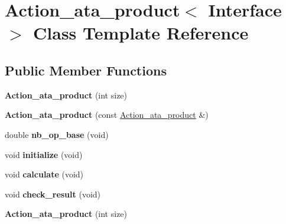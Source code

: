 \hypertarget{class_action__ata__product}{}\section{Action\+\_\+ata\+\_\+product$<$ Interface $>$ Class Template Reference}
\label{class_action__ata__product}
\subsection*{Public Member Functions}
\begin{DoxyCompactItemize}
\item 
\mbox{\label{class_action__ata__product_a54b37758c8600b09fe6f28ec260f2f4a}} 
{\bfseries Action\+\_\+ata\+\_\+product} (int size)
\item 
\mbox{\label{class_action__ata__product_a6ae7e6e084d74197f228c9efeb6833a3}} 
{\bfseries Action\+\_\+ata\+\_\+product} (const \hyperlink{class_action__ata__product}{Action\+\_\+ata\+\_\+product} \&)
\item 
\mbox{\label{class_action__ata__product_a63f70df6346f567e1015180b0282ff5c}} 
double {\bfseries nb\+\_\+op\+\_\+base} (void)
\item 
\mbox{\label{class_action__ata__product_aaac67c03f0421329ff311ebd1cca9dd9}} 
void {\bfseries initialize} (void)
\item 
\mbox{\label{class_action__ata__product_a15573d7fc39e087347d3cdf998e75f0c}} 
void {\bfseries calculate} (void)
\item 
\mbox{\label{class_action__ata__product_acf0798c064452e0336a690c1ef09b6dd}} 
void {\bfseries check\+\_\+result} (void)
\item 
\mbox{\label{class_action__ata__product_a54b37758c8600b09fe6f28ec260f2f4a}} 
{\bfseries Action\+\_\+ata\+\_\+product} (int size)
\item 
\mbox{\label{class_action__ata__product_a6ae7e6e084d74197f228c9efeb6833a3}} 

\end{DoxyCompactItemize}
